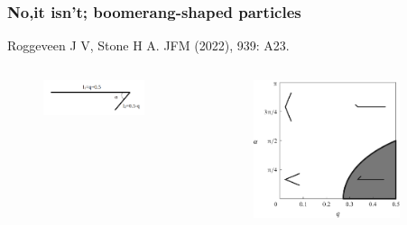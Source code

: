 \documentclass{beamer}
\begin{document}
\begin{frame}
	\frametitle{No,it isn't; boomerang-shaped particles}
	\begin{overlayarea}{\textwidth}{\textheight}
		\vspace{-0.5cm}
		\footnotesize Roggeveen J V, Stone H A. JFM (2022), 939: A23.\vspace{-0.2cm}
		\begin{columns}
			\vspace{-0.5cm}
			\begin{figure}[htb]
				\begin{center}
					\includegraphics[width=0.85\textwidth]{plots/geometry2.png}
				\end{center}
			\end{figure}
			\begin{figure}[htb]
			\begin{center}
				\includegraphics[width=0.85\textwidth]{plots/stone.png}

\end{center}
\end{figure}
\end{columns}
\end{overlayarea}
\end{frame}
\end{document}
